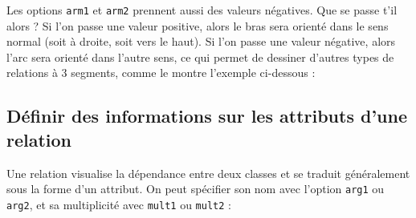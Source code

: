 \documentclass[a4paper,11pt]{report}
\newcommand{\inputTikZ}[1]{%
  }%
\newcommand{\inputTikZ}[1]{%
    \texttt{[image: fig/\#1.pdf]}%
  }%
\begin{document}
\medskip

\begin{minipage}{0.5\textwidth}

\end{minipage}
\begin{minipage}{0.4\textwidth}
\begin{center}
\inputTikZ{relationweight2}
\end{center}
\end{minipage}

\medskip

\begin{minipage}{0.5\textwidth}

\end{minipage}
\begin{minipage}{0.4\textwidth}
\begin{center}
\inputTikZ{relationarm}
\end{center}
\end{minipage}

\medskip

Les options {\tt arm1} et {\tt arm2} prennent aussi des valeurs négatives. Que se passe t'il alors ?
Si l'on passe une valeur positive, alors le bras sera orienté dans le sens normal (soit à droite, soit vers le haut). Si l'on passe une valeur négative, alors l'arc sera orienté dans l'autre sens, ce qui permet de dessiner d'autres types de relations à 3 segments, comme le montre l'exemple ci-dessous :

\medskip

\begin{minipage}{0.5\textwidth}

\end{minipage}
\begin{minipage}{0.4\textwidth}
\begin{center}
\inputTikZ{relationarm2}
\end{center}
\end{minipage}


\subsection{Définir des informations sur les attributs d'une relation}\label{ss.relattr}

Une relation visualise la dépendance entre deux classes et se traduit généralement sous la forme d'un attribut. On peut spécifier son nom avec l'option {\tt arg1} ou {\tt arg2}, et sa multiplicité avec {\tt mult1} ou {\tt mult2} :
\end{document}
